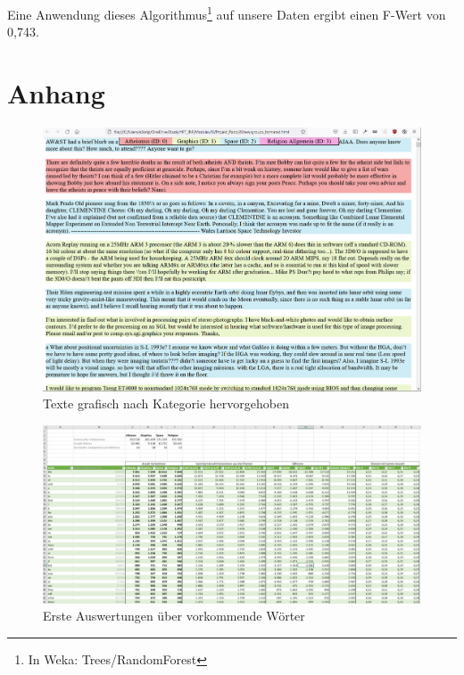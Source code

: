 \documentclass[
	11pt,
	a4paper
]{scrartcl}
\begin{document}
Eine Anwendung dieses Algorithmus\footnote{In Weka: Trees/RandomForest} auf unsere Daten ergibt einen F-Wert von 0,743.

\newpage
\section{Anhang}

\begin{figure}[H]
	\includegraphics[width=\textwidth]{figures/texte_grafisch_getrennt.png}
	\caption{Texte grafisch nach Kategorie hervorgehoben}
	\label{fig:texte_grafisch_getrennt}
\end{figure}

\begin{figure}[H]
	\includegraphics[width=\textwidth]{figures/wort_auswertung_excel.png}
	\caption{Erste Auswertungen über vorkommende Wörter}
	\label{fig:wort_auswertung_excel}
\end{figure}
\end{document}
